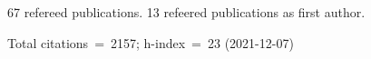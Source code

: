 67 refereed publications. 13 refeered publications as first author.

Total citations~=~2157; h-index~=~23 (2021-12-07)